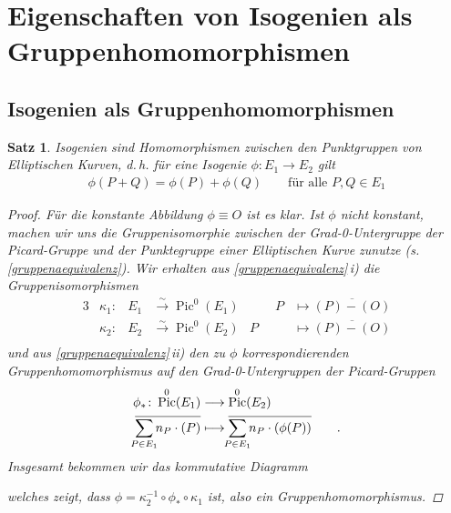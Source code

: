 \documentclass[english, german, parskip=half]{scrartcl}
\newtheorem{Satz}{Satz}[section]
\theoremstyle{definition}
\theoremstyle{remark}
\newcommand*{\longto}{\longrightarrow}
\DeclareMathOperator{\Pic}{Pic} %
\begin{document}

\section%
{Eigenschaften von Isogenien als Gruppenhomomorphismen}

\subsection{Isogenien als Gruppenhomomorphismen}
\begin{Satz}\label{isogenienhoms}
  Isogenien sind Homomorphismen zwischen den Punktgruppen von
  Elliptischen Kurven, d.\,h. für eine Isogenie $\phi\colon E_1\to
  E_2$ gilt
  \begin{gather*}
    \phi(P+Q) = \phi(P) + \phi(Q)
    \qquad \text{für alle } P,Q\in E_1
  \end{gather*}
\begin{proof}
  Für die konstante Abbildung $\phi\equiv O$ ist es klar.
  Ist $\phi$ nicht konstant, machen wir uns die Gruppenisomorphie
  zwischen der Grad-0-Untergruppe der Picard-Gruppe und der
  Punktegruppe einer Elliptischen Kurve zunutze
  (s.\,\autoref{gruppenaequivalenz}).
  Wir erhalten 
  aus \autoref{gruppenaequivalenz}\,i) die Gruppenisomorphismen 
  \begin{alignat*}{3}
    &\kappa_1\colon&
    E_1&\overset\sim\longto \Pic^0(E_1)
    &\qquad P &\longmapsto \overline{(P)-(O)}\\
    &\kappa_2\colon&
    E_2&\overset\sim\longto \Pic^0(E_2)
    &P &\longmapsto \overline{(P)-(O)}\\
  \end{alignat*}
  und aus \autoref{gruppenaequivalenz}\,ii) den zu $\phi$
  korrespondierenden Gruppenhomomorphismus auf den Grad-0-Untergruppen
  der Picard-Gruppen
  \begin{align*}
    \phi_*\colon \Pic^0(E_1) 
    &\longto \Pic^0(E_2)\\
    \overline{\sum_{\mathclap{P\in E_1}}n_P\cdot(P)}
    &\longmapsto 
      \overline{\sum_{\mathclap{P\in E_1}}n_P\cdot(\phi(P))}
      \qquad .
  \end{align*}
  Insgesamt bekommen wir das kommutative Diagramm
  \begin{center}
  \end{center}
  welches zeigt, dass $\phi=\kappa_2^{-1}\circ\phi_*\circ\kappa_1$
  ist, also ein Gruppenhomomorphismus.
\end{proof}
\end{Satz}
\end{document}
